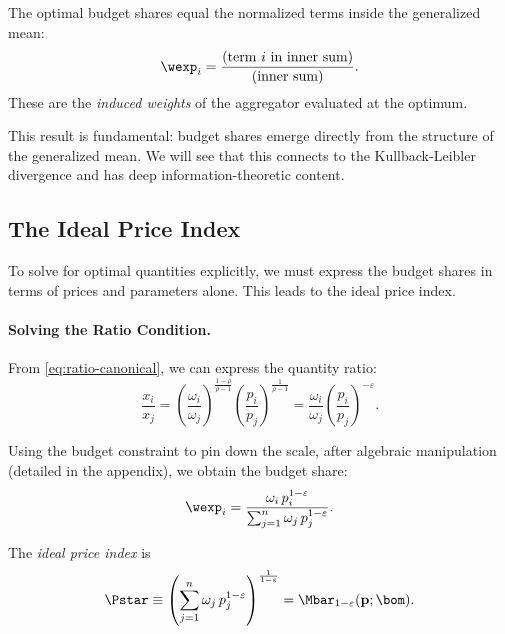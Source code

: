 \begin{proposition}
\label{prop:shares-induced}
The optimal budget shares equal the normalized terms inside the generalized mean:
\begin{equation}
\wexp_i = \frac{\text{(term $i$ in inner sum)}}{\text{(inner sum)}}.
\label{eq:shares-induced}
\end{equation}
These are the \emph{induced weights} of the aggregator evaluated at the optimum.
\end{proposition}

This result is fundamental: budget shares emerge directly from the structure of the generalized mean. We will see that this connects to the Kullback-Leibler divergence and has deep information-theoretic content.

\subsection{The Ideal Price Index}
\label{subsec:price-index}

To solve for optimal quantities explicitly, we must express the budget shares in terms of prices and parameters alone. This leads to the ideal price index.

\paragraph{Solving the Ratio Condition.}
From \cref{eq:ratio-canonical}, we can express the quantity ratio:
\begin{equation}
\frac{x_i}{x_j} = \left(\frac{\omega_i}{\omega_j}\right)^{\frac{1-\rho}{\rho-1}} \left(\frac{p_i}{p_j}\right)^{\frac{1}{\rho-1}} = \frac{\omega_i}{\omega_j} \left(\frac{p_i}{p_j}\right)^{-\varepsilon}.
\label{eq:quantity-ratio}
\end{equation}

Using the budget constraint to pin down the scale, after algebraic manipulation (detailed in the appendix), we obtain the budget share:
\begin{equation}
\wexp_i = \frac{\omega_i \, p_i^{1-\varepsilon}}{\sum_{j=1}^{n} \omega_j \, p_j^{1-\varepsilon}}.
\label{eq:share-prices}
\end{equation}

\begin{definition}
\label{def:price-index}
The \emph{ideal price index} is
\begin{equation}
\Pstar \equiv \left( \sum_{j=1}^{n} \omega_j \, p_j^{1-\varepsilon} \right)^{\frac{1}{1-\varepsilon}} = \Mbar_{1-\varepsilon}(\mathbf{p}; \bom).
\label{eq:price-index}
\end{equation}
\end{definition}

